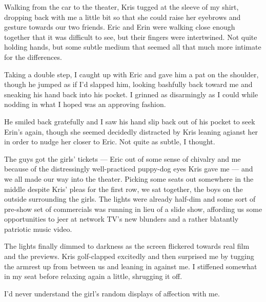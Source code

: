 Walking from the car to the theater, Kris tugged at the sleeve of my shirt, dropping back with me a little bit so that she could raise her eyebrows and gesture towards our two friends.  Eric and Erin were walking close enough together that it was difficult to see, but their fingers were intertwined.  Not quite holding hands, but some subtle medium that seemed all that much more intimate for the differences.

Taking a double step, I caught up with Eric and gave him a pat on the shoulder, though he jumped as if I'd slapped him, looking bashfully back toward me and sneaking his hand back into his pocket.  I grinned as disarmingly as I could while nodding in what I hoped was an approving fashion.

He smiled back gratefully and I saw his hand slip back out of his pocket to seek Erin's again, though she seemed decidedly distracted by Kris leaning agianst her in order to nudge her closer to Eric.  Not quite as subtle, I thought.

The guys got the girls' tickets --- Eric out of some sense of chivalry and me because of the distressingly well-practiced puppy-dog eyes Kris gave me --- and we all made our way into the theater.  Picking some seats out somewhere in the middle despite Kris' pleas for the first row, we sat together, the boys on the outside surrounding the girls.  The lights were already half-dim and some sort of pre-show set of commercials was running in lieu of a slide show, affording us some opportunities to jeer at network TV's new blunders and a rather blatantly patriotic music video.

The lights finally dimmed to darkness as the screen flickered towards real film and the previews.  Kris golf-clapped excitedly and then surprised me by tugging the armrest up from between us and leaning in against me.  I stiffened somewhat in my seat before relaxing again a little, shrugging it off.

I'd never understand the girl's random displays of affection with me.
